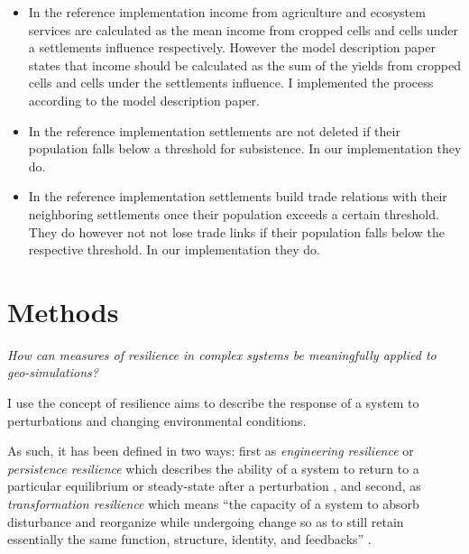 \begin{itemize}
    \item In the reference implementation income from agriculture and ecosystem services are calculated as the mean income from cropped cells and cells under a settlements influence respectively. However the model description paper states that income should be calculated as the sum of the yields from cropped cells and cells under the settlements influence. I implemented the process according to the model description paper.
    \item In the reference implementation settlements are not deleted if their population falls below a threshold for subsistence. In our implementation they do.
    \item In the reference implementation settlements build trade relations with their neighboring settlements once their population exceeds a certain threshold. They do however not not lose trade links if their population falls below the respective threshold. In our implementation they do.
\end{itemize}

\section{Methods}
\textit{How can measures of resilience in complex systems be meaningfully applied to geo-simulations?}

I use the concept of resilience \citep{Holling1973} aims to describe the response of a system to perturbations and changing environmental conditions. 


As such, it has been defined in two ways: 
first as \emph{engineering resilience} or \emph{persistence resilience} which describes the ability of a system to return to a particular equilibrium or steady-state after a perturbation \citep{Holling1973, Gunderson2000}, and
second, as \emph{transformation resilience} which means ``the capacity of a system to absorb disturbance and reorganize while undergoing change so as to still retain essentially the same function, structure, identity, and feedbacks'' \citep{Walker2004}.


